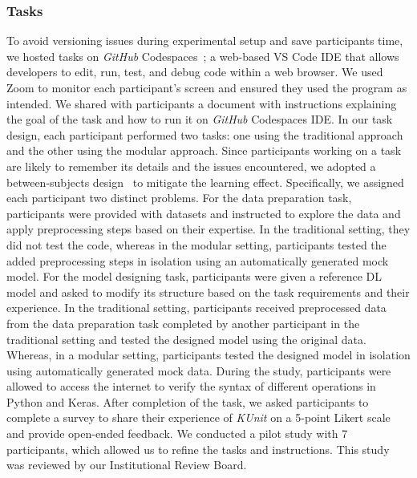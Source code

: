 \subsubsection{Tasks}
To avoid versioning issues during experimental setup and save participants time, we hosted tasks on \textit{GitHub} Codespaces~\cite{githubcodespaces}; a web-based VS Code IDE that allows developers to edit, run, test, and debug code within a web browser.
We used Zoom to monitor each participant's screen and ensured they used the program as intended.
We shared with participants a document with instructions explaining the goal of the task and how to run it on \textit{GitHub} Codespaces IDE.
In our task design, each participant performed two tasks: one using the traditional approach and the other using the modular approach.
Since participants working on a task are likely to remember its details and the issues encountered, we adopted a between-subjects design~\cite{davis2023nanofuzz}  to mitigate the learning effect. Specifically, we assigned each participant two distinct problems.
For the data preparation task, 
participants were provided with datasets and instructed to explore the data and apply preprocessing steps based on their expertise.
In the traditional setting, they did not test the code, whereas in the modular setting, participants tested the added preprocessing steps in isolation using an automatically generated mock model. 
For the model designing task, participants were given a reference DL model and asked to modify its structure based on the task requirements and their experience. In the traditional setting, participants received preprocessed data from the data preparation task completed by another participant in the traditional setting and tested the designed model using the original data. Whereas, in a modular setting, participants tested the designed model in isolation using automatically generated mock data.
During the study, participants were allowed to access the internet to verify the syntax of different operations in Python and Keras. 
After completion of the task, we asked participants to complete a survey to share their experience of {\em KUnit} on a 5-point Likert scale and provide open-ended feedback.
We conducted a pilot study with 7 participants, which allowed us to refine the tasks and instructions. This study was reviewed by our Institutional Review Board.



